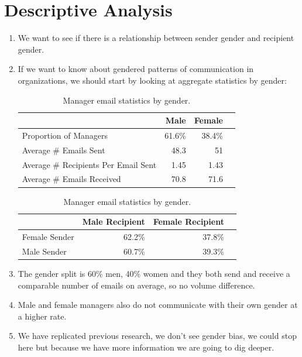 \documentclass[fleqn]{MJDArticle}
\begin{document}
\section{Descriptive Analysis}
\begin{enumerate}
	
	\item We want to see if there is a relationship between sender gender and recipient gender.
	\item If we want to know about gendered patterns of communication in organizations, we should start by looking at aggregate statistics by gender:
	
	
	\begin{table}[H]
	\centering
		\begin{tabular}{m{2in}rrr}
		\toprule
	& \textbf{Male} & \textbf{Female}  \\
		 \midrule
		 Proportion of Managers & 61.6\%& 38.4\% \\
		 \midrule
		 Average \# Emails Sent & 48.3 & 51 \\
		 Average \# Recipients Per Email Sent & 1.45 & 1.43 \\
		 \midrule
		 Average \# Emails Received & 70.8 & 71.6 \\
		\bottomrule
		\end{tabular}
		\caption{\label{tab:email agg stats}Manager email statistics by gender.}
	\end{table}
	
	
	\begin{table}[H]
	\centering
		\begin{tabular}{lrrr}
		\toprule
	& \textbf{Male Recipient} & \textbf{Female Recipient}  \\
		 \midrule
		 Female Sender & 62.2\% & 37.8\% \\
		 Male Sender & 60.7\% & 39.3\%  \\
		\bottomrule
		\end{tabular}
		\caption{\label{tab:email agg stats}Manager email statistics by gender.}
	\end{table}
	
	\item The gender split is 60\% men, 40\% women and they both send and receive a comparable number of emails on average, so no volume difference.
	\item Male and female managers also do not communicate with their own gender at a higher rate. 
	
	\item We have replicated previous research, we don't see gender bias, we could stop here but because we have more information we are going to dig deeper.
	

\end{enumerate}
\end{document}
